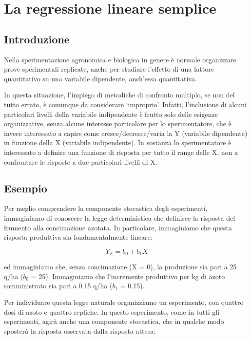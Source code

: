 \documentclass[a4paper,12pt,oneside]{book}
\theoremstyle{definition}
\theoremstyle{definition}
\theoremstyle{definition}
\theoremstyle{remark}
\begin{document}
\chapter{La regressione lineare
semplice}\label{la-regressione-lineare-semplice}

\section{Introduzione}\label{introduzione-5}

Nella sperimentazione agronomica e biologica in genere è normale
organizzare prove sperimentali replicate, anche per studiare l'effetto
di una fattore quantitativo su una variabile dipendente, anch'essa
quantitativa.

In questa situazione, l'impiego di metodiche di confronto multiplo, se
non del tutto errato, è comunque da considerare `improprio'. Infatti,
l'inclusione di alcuni particolari livelli della variabile indipendente
è frutto solo delle esigenze organizzative, senza alcune interesse
particolare per lo sperimentatore, che è invece interessato a capire
come cresce/decresce/varia la Y (variabile dipendente) in funzione della
X (variabile indipendente). In sostanza lo sperimentatore è interessato
a definire una funzione di risposta per tutto il range delle X, non a
confrontare le risposte a due particolari livelli di X.

\section{Esempio}\label{esempio-6}

Per meglio comprendere la componente stocastica degli esperimenti,
immaginiamo di conoscere la legge deterministica che definisce la
risposta del frumento alla concimazione azotata. In particolare,
immaginiamo che questa risposta produttiva sia fondamentalmente lineare:

\[Y_E = b_0 + b_1 X\]

ed immaginiamo che, senza concimazione (X = 0), la produzione sia pari a
25 q/ha (\(b_0\) = 25). Immaginiamo che l'incremente produttivo per kg
di azoto somministrato sia pari a 0.15 q/ha (\(b_1\) = 0.15).

Per individuare questa legge naturale organizziamo un esperimento, con
quattro dosi di azoto e quattro repliche. In questo esperimento, come in
tutti gli esperimenti, agirà anche una componente stocastica, che in
qualche modo sposterà la risposta osservata dalla risposta attesa:
\end{document}
